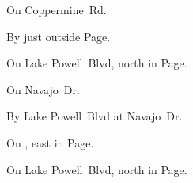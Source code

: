 
\begin{LocationList}

On Coppermine~Rd.

By  just outside Page.

On Lake Powell~Blvd, north in Page.

On  Navajo~Dr.

By Lake Powell~Blvd at  Navajo~Dr.

\Location{\TruckService \Service \Rest}
On , east in Page.

\Location{\TruckStop \Gas \Rest}
On Lake Powell~Blvd, north in Page.

\end{LocationList}
